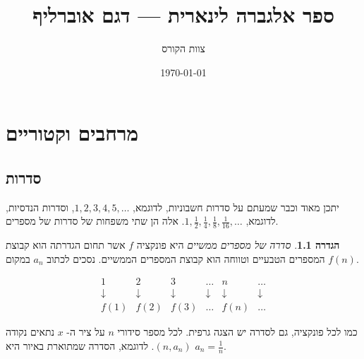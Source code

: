 \documentclass[12pt]{book}
\title{ספר אלגברה לינארית — דגם אוברליף}
\author{צוות הקורס}
\date{\today}
\theoremstyle{plain}
\theoremstyle{definition}
\newtheorem{definition}[theorem]{הגדרה}
\begin{document}
\frontmatter
\maketitle
\tableofcontents
\mainmatter

\chapter{מרחבים וקטוריים}
\section{סדרות}

יתכן מאוד וכבר שמעתם על סדרות חשבוניות,
לדוגמא,
$1,2,3,4,5,\ldots$, 
וסדרות הנדסיות, 
לדוגמא, 
$1,\frac{1}{2},\frac{1}{4},\frac{1}{8},\frac{1}{16},\ldots$. 
אלה הן שתי משפחות של סדרות של מספרים. 
\begin{definition}
{\it סדרה של מספרים ממשיים} 
היא פונקציה 
$f$ 
אשר תחום הגדרתה הוא קבוצת המספרים הטבעיים וטווחה הוא קבוצת המספרים הממשיים. 
נסכים לכתוב 
$a_n$ 
במקום 
$f(n)$.
\end{definition}
\[
\begin{array}{cccccc}
1 & 2 & 3 & \ldots & n & \ldots \\
\downarrow & \downarrow & \downarrow & \downarrow & \downarrow & \downarrow \\
f(1) & f(2) & f(3) & \ldots & f(n) & \ldots
\end{array}
\]


כמו לכל פונקציה, גם לסדרה יש הצגה גרפית. לכל מספר סידורי 
$n$ 
על ציר ה- 
$x$ 
נתאים 
נקודה 
$(n,a_n)$. 
לדוגמא, הסדרה שמתוארת באיור היא 
$a_n=\frac{1}{n}$. 


\vspace{1cm}

\begin{center}
\end{center}
\end{document}
